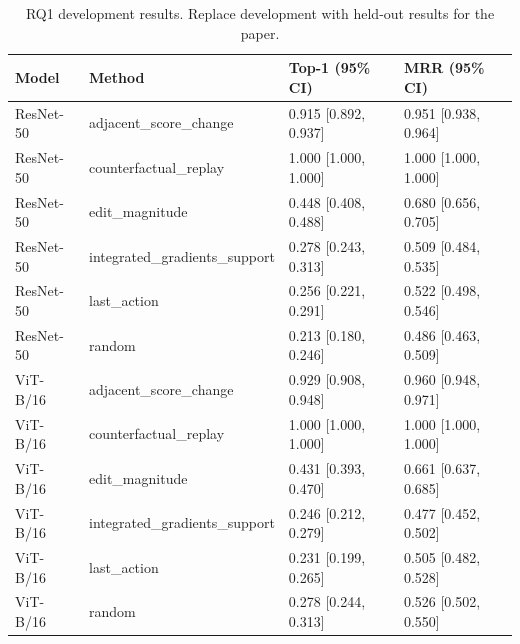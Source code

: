 \begin{table}[t]
\centering
\caption{RQ1 development results. Replace development with held-out results for the paper.}
\label{tab:rq1}
\begin{tabular}{llll}
\toprule
Model & Method & Top-1 (95\% CI) & MRR (95\% CI) \\
\midrule
ResNet-50 & adjacent\_score\_change & 0.915 [0.892, 0.937] & 0.951 [0.938, 0.964] \\
ResNet-50 & counterfactual\_replay & 1.000 [1.000, 1.000] & 1.000 [1.000, 1.000] \\
ResNet-50 & edit\_magnitude & 0.448 [0.408, 0.488] & 0.680 [0.656, 0.705] \\
ResNet-50 & integrated\_gradients\_support & 0.278 [0.243, 0.313] & 0.509 [0.484, 0.535] \\
ResNet-50 & last\_action & 0.256 [0.221, 0.291] & 0.522 [0.498, 0.546] \\
ResNet-50 & random & 0.213 [0.180, 0.246] & 0.486 [0.463, 0.509] \\
ViT-B/16 & adjacent\_score\_change & 0.929 [0.908, 0.948] & 0.960 [0.948, 0.971] \\
ViT-B/16 & counterfactual\_replay & 1.000 [1.000, 1.000] & 1.000 [1.000, 1.000] \\
ViT-B/16 & edit\_magnitude & 0.431 [0.393, 0.470] & 0.661 [0.637, 0.685] \\
ViT-B/16 & integrated\_gradients\_support & 0.246 [0.212, 0.279] & 0.477 [0.452, 0.502] \\
ViT-B/16 & last\_action & 0.231 [0.199, 0.265] & 0.505 [0.482, 0.528] \\
ViT-B/16 & random & 0.278 [0.244, 0.313] & 0.526 [0.502, 0.550] \\
\bottomrule
\end{tabular}
\end{table}
